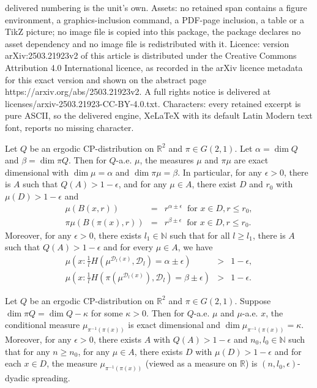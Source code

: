 \documentclass[10pt,a4paper]{amsart}
\def\D{\mathcal{D}}
\def\N{\mathbb N}
\def\R{\mathbb R}
\begin{document}
delivered numbering is the unit's own. Assets: no retained span contains a figure environment, a graphics-inclusion command, a PDF-page inclusion, a table or a TikZ picture; no image file is copied into this package, the package declares no asset dependency and no image file is redistributed with it. Licence: version arXiv:2503.21923v2 of this article is distributed under the Creative Commons Attribution 4.0 International licence, as recorded in the arXiv licence metadata for this exact version and shown on the abstract page https://arxiv.org/abs/2503.21923v2. A full rights notice is delivered at licenses/arxiv-2503.21923-CC-BY-4.0.txt. Characters: every retained excerpt is pure ASCII, so the delivered engine, XeLaTeX with its default Latin Modern text font, reports no missing character.
\begin{proposition}\label{prop:dim-projection-cp-distribution:1}
Let $Q$ be an ergodic CP-distribution on $\R^2$ and $\pi\in G(2,1)$.  Let $\alpha=\dim Q$ and $\beta=\dim \pi Q$. Then for $Q$-a.e.  $\mu$,  the measures $\mu$ and $\pi \mu$ are exact dimensional with $\dim \mu=\alpha$ and $\dim \pi \mu=\beta$.   In particular, for any $\epsilon>0$,  there is  $A$ such that $Q(A)>1-\epsilon$,  and for any $ \mu\in A$,  there exist $D$ and $r_0$ with $\mu(D)>1-\epsilon$ and 
\begin{eqnarray}
 \mu(B(x,r)) & = & r^{\alpha\pm \epsilon} \  \textrm{ for } x\in D,  r\le r_0,  \label{eq:prop:dim-projection-cp-distribution:1:1}\\
\pi\mu(B(\pi(x),r)) & = & r^{\beta\pm \epsilon} \  \textrm{ for } x\in D,  r\le r_0.\label{eq:prop:dim-projection-cp-distribution:1:2}
\end{eqnarray}
Moreover, for any $\epsilon>0$, there exists $l_1\in \N$ such that for all $l\ge l_1$, there is $A$ such that $Q(A)>1-\epsilon$ and for every $\mu\in A$, we have
\begin{eqnarray}
\mu\left( x: \frac{1}{l}H\left(\mu^{\D_l(x)},\D_l\right)  =  \alpha\pm \epsilon \right) &>& 1-\epsilon, \label{eq:prop:dim-projection-cp-distribution:1:3}\\
\mu\left( x: \frac{1}{l}H\left(\pi\left(\mu^{\D_l(x)}\right),\D_l\right) =  \beta\pm \epsilon \right) &>& 1-\epsilon.\label{eq:prop:dim-projection-cp-distribution:1:4}
\end{eqnarray}
\end{proposition}

\begin{proposition}\label{prop:slice-cp-distribution:1}
Let $Q$ be an ergodic  CP-distribution on $\R^2$ and $\pi\in G(2,1)$.  Suppose $\dim \pi Q = \dim Q-\kappa$ for some $\kappa>0$. Then for $Q$-a.e.  $\mu$ and $\mu$-a.e.  $x$, the conditional measure $\mu_{\pi^{-1}(\pi(x))}$ is exact dimensional and $\dim \mu_{\pi^{-1}(\pi(x))}=\kappa$.  Moreover,  for any $\epsilon>0$, there exists $A$ with $Q(A)>1-\epsilon$ and $n_0,l_0\in \N$ such that for any $n\ge n_0$, for any $\mu\in A$, there exists $D$  with $\mu(D)>1-\epsilon$ and for each $x\in D$, the measure $\mu_{\pi^{-1}(\pi(x))}$ (viewed as a measure on $\R$) is $(n,l_0,\epsilon)$-dyadic spreading.
\end{proposition}
\end{document}

